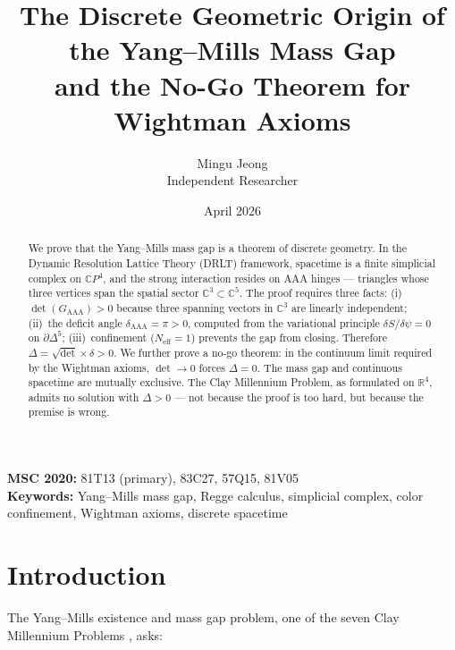 \documentclass[12pt]{article}
\theoremstyle{remark}
\begin{document}
\title{The Discrete Geometric Origin of the Yang--Mills Mass Gap\\
and the No-Go Theorem for Wightman Axioms}
\author{Mingu Jeong\\Independent Researcher}
\date{April 2026}
\maketitle

\noindent
\textbf{MSC 2020:} 81T13 (primary), 83C27, 57Q15, 81V05\\
\textbf{Keywords:} Yang--Mills mass gap, Regge calculus, simplicial
complex, color confinement, Wightman axioms, discrete spacetime

\begin{abstract}
We prove that the Yang--Mills mass gap is a theorem of discrete geometry.
In the Dynamic Resolution Lattice Theory (DRLT) framework, spacetime is a
finite simplicial complex on $\mathbb{C}P^4$, and the strong interaction
resides on AAA hinges --- triangles whose three vertices span the spatial
sector $\mathbb{C}^3 \subset \mathbb{C}^5$. The proof requires three facts:
(i)~$\det(G_{\mathrm{AAA}}) > 0$ because three spanning vectors in
$\mathbb{C}^3$ are linearly independent;
(ii)~the deficit angle $\delta_{\mathrm{AAA}} = \pi > 0$, computed
from the variational principle $\delta S/\delta\psi = 0$ on $\partial\Delta^5$;
(iii)~confinement ($N_{\mathrm{eff}} = 1$) prevents the gap from closing.
Therefore $\Delta = \sqrt{\det} \times \delta > 0$.
We further prove a no-go theorem: in the continuum limit required by the
Wightman axioms, $\det \to 0$ forces $\Delta = 0$. The mass gap and
continuous spacetime are mutually exclusive. The Clay Millennium Problem,
as formulated on $\mathbb{R}^4$, admits no solution with $\Delta > 0$
--- not because the proof is too hard, but because the premise is wrong.
\end{abstract}

\tableofcontents

\section{Introduction}
\label{sec:intro}

The Yang--Mills existence and mass gap problem, one of the seven Clay
Millennium Problems \cite{Clay}, asks:
\end{document}
